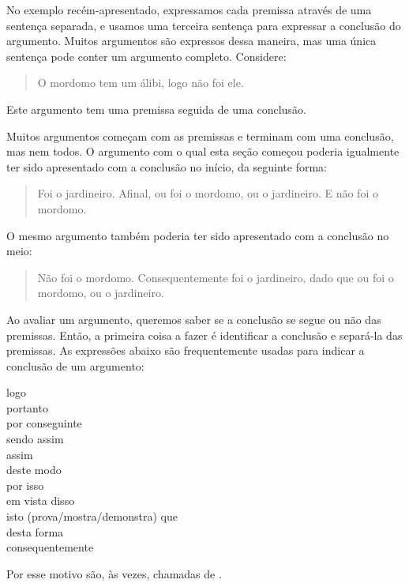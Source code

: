 No exemplo recém-apresentado, expressamos cada premissa através de uma sentença separada, e usamos uma terceira sentença para  expressar a conclusão do argumento.
Muitos argumentos são expressos dessa maneira, mas uma única sentença pode conter um argumento completo.
Considere:
	\begin{quote}
		O mordomo tem um álibi, logo não foi ele.
	\end{quote}
Este argumento tem uma premissa seguida de uma conclusão.

Muitos argumentos começam com as premissas e terminam com uma conclusão, mas nem todos. O argumento com o qual esta seção começou poderia igualmente ter sido apresentado com a conclusão no início, da seguinte forma:
	\begin{quote}
		Foi o jardineiro. Afinal, ou foi o mordomo, ou o jardineiro. E não foi o mordomo.
	\end{quote}
O mesmo argumento também poderia ter sido apresentado com a conclusão no meio:
	\begin{quote}
		Não foi o mordomo. Consequentemente foi o jardineiro, dado que ou foi o mordomo, ou o jardineiro.
	\end{quote}
Ao avaliar um argumento, queremos saber se a conclusão se segue ou não das premissas.
Então, a primeira coisa a fazer é identificar a conclusão e separá-la das premissas.
As expressões abaixo são frequentemente usadas para indicar a conclusão de um argumento:
	\begin{center}
		logo\\ portanto\\ por conseguinte\\ sendo assim\\ assim\\ deste modo\\ por isso\\ em vista disso\\ isto (prova/mostra/demonstra) que\\ desta forma\\ consequentemente
	\end{center}
Por esse motivo são, às vezes, chamadas de .

